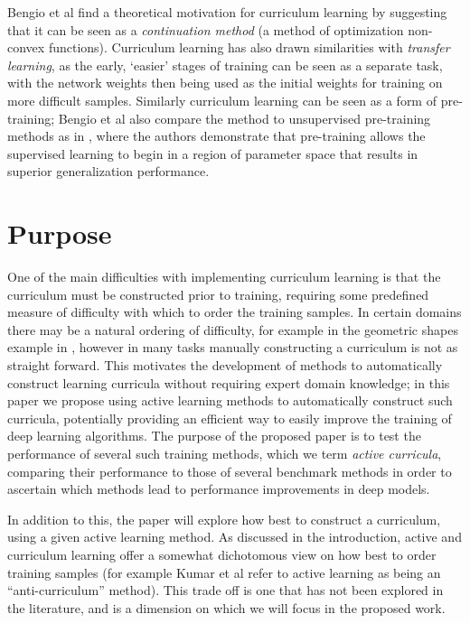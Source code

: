 \documentclass[a4paper,10pt]{article}
\begin{document}
Bengio et al \cite{Bengio 09} find a theoretical motivation for curriculum learning by suggesting that it can be seen as a \textit{continuation method} (a method of optimization non-convex functions). Curriculum learning has also drawn similarities with \textit{transfer learning}, as the early, `easier' stages of training can be seen as a separate task, with the network weights then being used as the initial weights for training on more difficult samples. Similarly curriculum learning can be seen as a form of pre-training; Bengio et al \cite{Bengio 09} also compare the method to unsupervised pre-training methods as in \cite{Erhan 09}, where the authors demonstrate that pre-training allows the supervised learning to begin in a region of parameter space that results in superior generalization performance. 

\section{Purpose}
One of the main difficulties with implementing curriculum learning is that the curriculum must be constructed prior to training, requiring some predefined measure of difficulty with which to order the training samples. In certain domains  there may be a natural ordering of difficulty, for example in the geometric shapes example in \cite{Bengio 09}, however in many tasks manually constructing a curriculum is not as straight forward. This motivates the development of methods to automatically construct learning curricula without requiring expert domain knowledge; in this paper we propose using active learning methods to automatically construct such curricula, potentially providing an efficient way to easily improve the training of deep learning algorithms. The purpose of the proposed paper is to test the performance of several such training methods, which we term \textit{active curricula}, comparing their performance to those of several benchmark methods in order to ascertain which methods lead to performance improvements in deep models.

In addition to this, the paper will explore how best to construct a curriculum, using a given active learning method. As discussed in the introduction, active and curriculum learning offer a somewhat dichotomous view on how best to order training samples (for example Kumar et al \cite{Koller 2010} refer to active learning as being an ``anti-curriculum'' method). This trade off is one that has not been explored in the literature, and is a dimension on which we will focus in the proposed work. 
\end{document}
